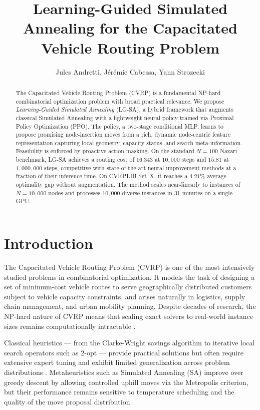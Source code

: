 \documentclass[letterpaper]{article} %
\title{Learning-Guided Simulated Annealing for the Capacitated Vehicle Routing Problem}
\author{
Jules Andretti,
Jérémie Cabessa,
Yann Strozecki
}
\begin{document}
\maketitle

\begin{abstract}
The Capacitated Vehicle Routing Problem (CVRP) is a fundamental NP-hard combinatorial optimization problem with broad practical relevance. We propose \emph{Learning-Guided Simulated Annealing} (LG-SA), a hybrid framework that augments classical Simulated Annealing with a lightweight neural policy trained via Proximal Policy Optimization (PPO). The policy, a two-stage conditional MLP, learns to propose promising node-insertion moves from a rich, dynamic node-centric feature representation capturing local geometry, capacity status, and search meta-information. Feasibility is enforced by proactive action masking. On the standard $N=100$ Nazari benchmark, LG-SA achieves a routing cost of $16.343$ at $10{,}000$ steps and $15.81$ at $1{,}000{,}000$ steps, competitive with state-of-the-art neural improvement methods at a fraction of their inference time. On CVRPLIB Set~X, it reaches a $4.21\%$ average optimality gap without augmentation. The method scales near-linearly to instances of $N=10{,}000$ nodes and processes $10{,}000$ diverse instances in 31 minutes on a single GPU.
\end{abstract}


\section{Introduction}

The Capacitated Vehicle Routing Problem (CVRP) \citep{dantzig_truck_1959} is one of the most intensively studied problems in combinatorial optimization. It models the task of designing a set of minimum-cost vehicle routes to serve geographically distributed customers subject to vehicle capacity constraints, and arises naturally in logistics, supply chain management, and urban mobility planning. Despite decades of research, the NP-hard nature of CVRP means that scaling exact solvers to real-world instance sizes remains computationally intractable \citep{toth_vehicle_2002}.

Classical heuristics --- from the Clarke-Wright savings algorithm \citep{clarke_scheduling_1964} to iterative local search operators such as 2-opt --- provide practical solutions but often require extensive expert tuning and exhibit limited generalization across problem distributions \citep{liu_heuristics_2023}. Metaheuristics such as Simulated Annealing (SA) \citep{kirkpatrick_optimization_1983} improve over greedy descent by allowing controlled uphill moves via the Metropolis criterion, but their performance remains sensitive to temperature scheduling and the quality of the move proposal distribution.
\end{document}
